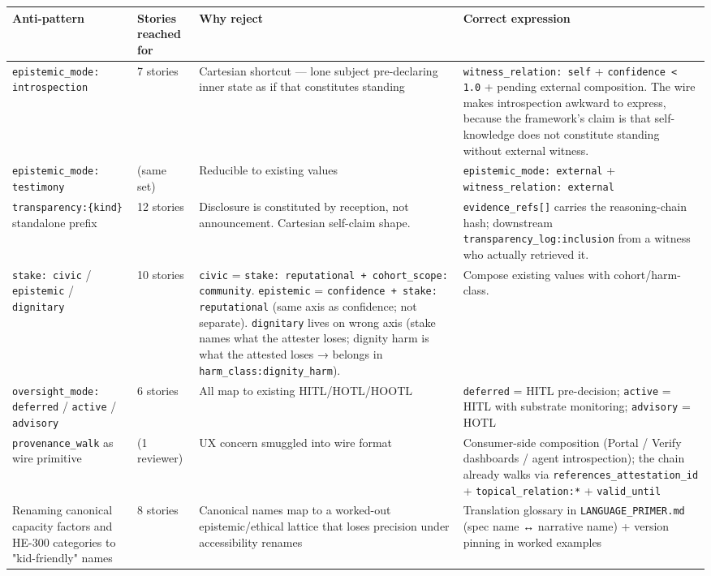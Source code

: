 \documentclass[11pt]{article}
\begin{document}
{\scriptsize
\begin{longtable}{|p{4.0cm}|p{4.0cm}|p{4.0cm}|p{4.0cm}|}\hline
\textbf{Anti-pattern} & \textbf{Stories reached for} & \textbf{Why reject} & \textbf{Correct expression} \\ \hline\endhead
\texttt{epistemic\_mode: introspection} & 7 stories & Cartesian shortcut — lone subject pre-declaring inner state as if that constitutes standing & \texttt{witness\_relation: self} + \texttt{confidence < 1.0} + pending external composition. The wire makes introspection awkward to express, because the framework's claim is that self-knowledge does not constitute standing without external witness. \\ \hline
\texttt{epistemic\_mode: testimony} & (same set) & Reducible to existing values & \texttt{epistemic\_mode: external} + \texttt{witness\_relation: external} \\ \hline
\texttt{transparency:\{kind\}} standalone prefix & 12 stories & Disclosure is constituted by reception, not announcement. Cartesian self-claim shape. & \texttt{evidence\_refs[]} carries the reasoning-chain hash; downstream \texttt{transparency\_log:inclusion} from a witness who actually retrieved it. \\ \hline
\texttt{stake: civic} / \texttt{epistemic} / \texttt{dignitary} & 10 stories & \texttt{civic} = \texttt{stake: reputational + cohort\_scope: community}. \texttt{epistemic} = \texttt{confidence + stake: reputational} (same axis as confidence; not separate). \texttt{dignitary} lives on wrong axis (stake names what the attester loses; dignity harm is what the attested loses → belongs in \texttt{harm\_class:dignity\_harm}). & Compose existing values with cohort/harm-class. \\ \hline
\texttt{oversight\_mode: deferred} / \texttt{active} / \texttt{advisory} & 6 stories & All map to existing HITL/HOTL/HOOTL & \texttt{deferred} = HITL pre-decision; \texttt{active} = HITL with substrate monitoring; \texttt{advisory} = HOTL \\ \hline
\texttt{provenance\_walk} as wire primitive & (1 reviewer) & UX concern smuggled into wire format & Consumer-side composition (Portal / Verify dashboards / agent introspection); the chain already walks via \texttt{references\_attestation\_id} + \texttt{topical\_relation:*} + \texttt{valid\_until} \\ \hline
Renaming canonical capacity factors and HE-300 categories to "kid-friendly" names & 8 stories & Canonical names map to a worked-out epistemic/ethical lattice that loses precision under accessibility renames & Translation glossary in \texttt{LANGUAGE\_PRIMER.md} (spec name ↔ narrative name) + version pinning in worked examples \\ \hline
\end{longtable}}
\end{document}
